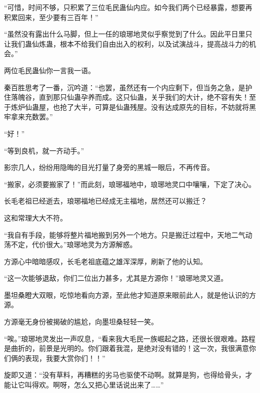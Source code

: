 \begin{this_body}
“可惜，时间不够，只积累了三位毛民蛊仙内应。如今我们两个已经暴露，想要再积累回来，至少要有三百年！”

“虽然没有露出什么马脚，但上一任的琅琊地灵似乎察觉到了什么。因此平日里只让我们蛊仙炼蛊，根本不给我们自由出入的权利，以及试演战斗，提高战斗力的机会。”

两位毛民蛊仙你一言我一语。

秦百胜思考了一番，沉吟道：“也罢，虽然还有一个内应剩下，但当务之急，是护住落魄谷，直到那只仙蛊孕养而成。这只仙蛊，关乎我们的大计，绝不容有失！至于炼炉仙蛊屋，也抢了大半，可算是仙蛊残屋。没有达成原先的目标，不妨就将黑牢拿来充数罢。”

“好！”

“等到良机，就一齐动手。”

影宗几人，纷纷用隐晦的目光打量了身旁的黑城一眼后，不再传音。

“搬家，必须要搬家了！”而此刻，琅琊福地中，琅琊地灵口中嚷嚷，下定了决心。

长毛老祖已经逝去，琅琊福地已经成无主福地，居然还可以搬迁？

这和常理大大不符。

“我自有手段，能够将整片福地搬到另外一个地方。只是搬迁过程中，天地二气动荡不定，代价很大。”琅琊地灵为方源解惑。

方源心中暗暗感叹，长毛老祖底蕴之雄浑深厚，刷新了他的认知。

“这一次能够退敌，你们二位出力甚多，尤其是方源你！”琅琊地灵又道。

墨坦桑瞪大双眼，吃惊地看向方源，至此他才知道原来眼前此人，就是他认识的方源。

方源毫无身份被揭破的尴尬，向墨坦桑轻轻一笑。

“唉。”琅琊地灵发出一声叹息，“看来我大毛民一族崛起之路，还很长很艰难。路程是曲折的，前景是光明的。你们跟着我混，是绝对没有错的！这一次，我很满意你们俩的表现，我要大赏你们！！”

旋即又道：“没有草料，再糟糕的劣马也驱使不动啊。就算是狗，也得给骨头，才能让它叫得欢。啊呀，怎么又把心里话说出来了……”

\end{this_body}

